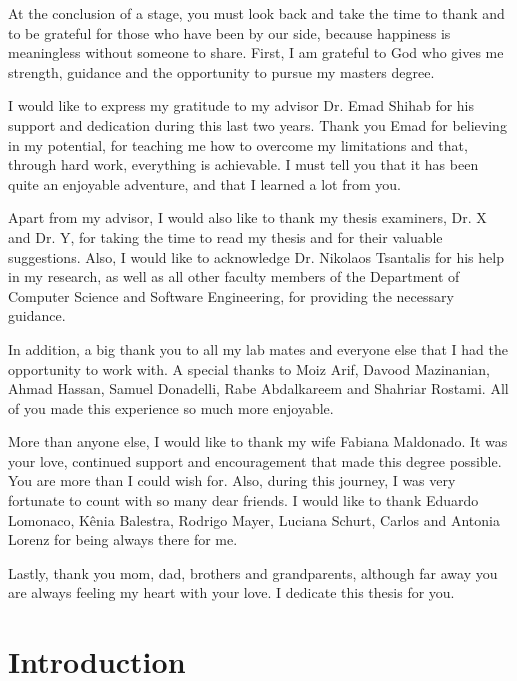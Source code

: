 \documentclass[12pt]{report}
\begin{document}
\begin{acknowledgments}
At the conclusion of a stage, you must look back and take the time to thank and to be grateful for those who have been by our side, because happiness is meaningless without someone to share. First, I am grateful to God who gives me strength, guidance and the opportunity to pursue my masters degree. 

I would like to express my gratitude to my advisor Dr. Emad Shihab for his support and dedication during this last two years. Thank you Emad for believing in my potential, for teaching me how to overcome my limitations and that, through hard work, everything is achievable. I must tell you that it has been quite an enjoyable adventure, and that I learned a lot from you. 

Apart from my advisor, I would also like to thank my thesis examiners, Dr. X and Dr. Y, for taking the time to read my thesis and for their valuable suggestions. Also, I would like to acknowledge Dr. Nikolaos Tsantalis for his help in my research, as well as all other faculty members of the Department of Computer Science and Software Engineering, for providing the necessary guidance.

In addition, a big thank you to all my lab mates and everyone else that I had the opportunity to work with. A special thanks to Moiz Arif, Davood Mazinanian, Ahmad Hassan, Samuel Donadelli, Rabe Abdalkareem and Shahriar Rostami. All of you made this experience so much more enjoyable. 

More than anyone else, I would like to thank my wife Fabiana Maldonado. It was your love, continued support and encouragement that made this degree possible. You are more than I could wish for. Also, during this journey, I was very fortunate to count with so many dear friends. I would like to thank Eduardo Lomonaco, K\^{e}nia Balestra, Rodrigo Mayer, Luciana Schurt, Carlos and Antonia Lorenz for being always there for me. 

Lastly, thank you mom, dad, brothers and grandparents, although far away you are always feeling my heart with your love. I dedicate this thesis for you.

\end{acknowledgments}


\chapter{Introduction}
\label{introduction}

\end{document}
